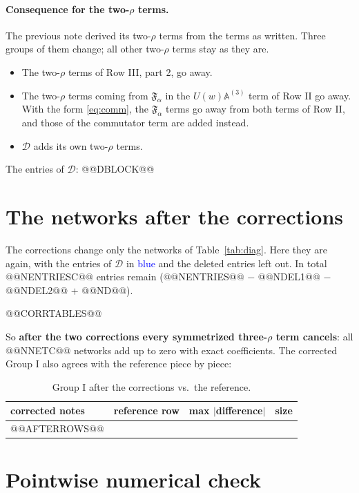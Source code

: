 \documentclass[10pt]{article}
\numberwithin{equation}{section}
\begin{document}
\paragraph{Consequence for the two-$\rho$ terms.} The previous note derived its two-$\rho$ terms from the terms as written. Three groups of them change; all other two-$\rho$ terms stay as they are.
\begin{itemize}
\item The two-$\rho$ terms of Row III, part 2, go away.
\item The two-$\rho$ terms coming from $\mathfrak F_\alpha$ in the $U(w)\mathbb A^{(3)}$ term of Row II go away. With the form \eqref{eq:comm}, the $\mathfrak F_\alpha$ terms go away from both terms of Row II, and those of the commutator term are added instead.
\item $\mathcal D$ adds its own two-$\rho$ terms.
\end{itemize}

The entries of $\mathcal D$:
@@DBLOCK@@

\section{The networks after the corrections}\label{sec:after}

The corrections change only the networks of Table~\ref{tab:diag}. Here they are again, with the entries of $\mathcal D$ in \textcolor{blue}{blue} and the deleted entries left out. In total @@NENTRIESC@@ entries remain (@@NENTRIES@@ $-$ @@NDEL1@@ $-$ @@NDEL2@@ $+$ @@ND@@).

@@CORRTABLES@@

\medskip
So \textbf{after the two corrections every symmetrized three-$\rho$ term cancels}: all @@NNETC@@ networks add up to zero with exact coefficients. The corrected Group I also agrees with the reference piece by piece:

\begin{table}[h]
\centering\small
\begin{tabular}{@{}l l c c@{}}
corrected notes & reference row & max $|$difference$|$ & size\\ \hline
@@AFTERROWS@@
\end{tabular}
\caption{Group I after the corrections vs.\ the reference.}
\label{tab:after}
\end{table}

\section{Pointwise numerical check}\label{sec:pointwise}
\end{document}
